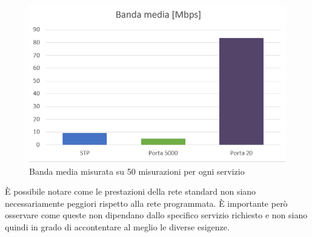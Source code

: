 \begin{figure}[H]
	\centering
	\includegraphics[width=1\linewidth]{../immagini/esempio/bw_media}
	\caption[Banda media]{Banda media misurata su 50 misurazioni per ogni servizio}
	\label{fig:bwmedia}
\end{figure}

È possibile notare come le prestazioni della rete standard non siano necessariamente peggiori rispetto alla rete programmata. È importante però osservare come queste non dipendano dallo specifico servizio richiesto e non siano quindi in grado di accontentare al meglio le diverse esigenze.